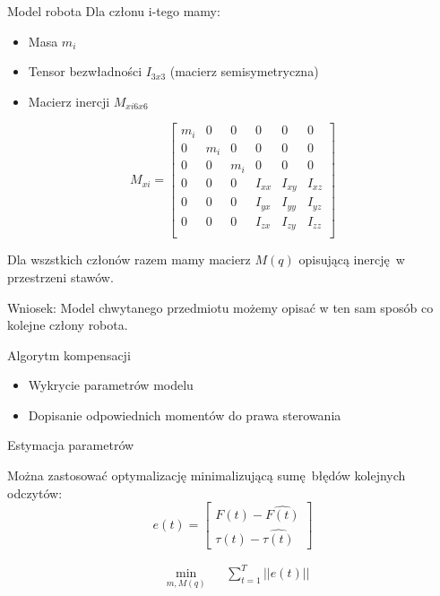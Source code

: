 \documentclass{beamer}
\begin{document}
\begin{frame}{Model robota}
	Dla członu i-tego mamy:
	\begin{itemize}
		\item Masa $m_i$
		\item Tensor bezwładności $I_{3x3}$ (macierz semisymetryczna)
		\item Macierz inercji $M_{xi 6x6}$
	\end{itemize}
	\begin{equation}
	M_{xi}=
	\begin{bmatrix}
	m_i & 0 & 0 & 0 & 0 & 0 \\
	0 & m_i & 0 & 0 & 0 & 0 \\
	0 & 0 & m_i & 0 & 0 & 0 \\
	0 & 0 & 0 & I_{xx} & I_{xy} & I_{xz} \\
	0 & 0 & 0 & I_{yx} & I_{yy} & I_{yz} \\
	0 & 0 & 0 & I_{zx} & I_{zy} & I_{zz} \\
	\end{bmatrix}
	\end{equation}

	Dla wszstkich członów razem mamy macierz $M(q)$ opisującą inercję w przestrzeni stawów.


	Wniosek: Model chwytanego przedmiotu możemy opisać w ten sam sposób co kolejne człony robota.
\end{frame}

\begin{frame}{Algorytm kompensacji}
	\begin{itemize}
		\item Wykrycie parametrów modelu
		\item Dopisanie odpowiednich momentów do prawa sterowania
	\end{itemize}
\end{frame}

\begin{frame}{Estymacja parametrów}

	Można zastosować optymalizację minimalizującą sumę błędów kolejnych odczytów:
	\begin{equation}
	e(t) = \begin{bmatrix}
	F(t) - \hat{F(t)}\\
	\tau(t) - \hat{\tau(t)}
	\end{bmatrix}
	\end{equation}

	\begin{equation}
	\begin{aligned}
	& \underset{m, M(q)}{\text{min}}
	& & \sum_{t = 1}^{T} || e(t) ||
	\end{aligned}
	\end{equation}

\end{frame}
\end{document}
